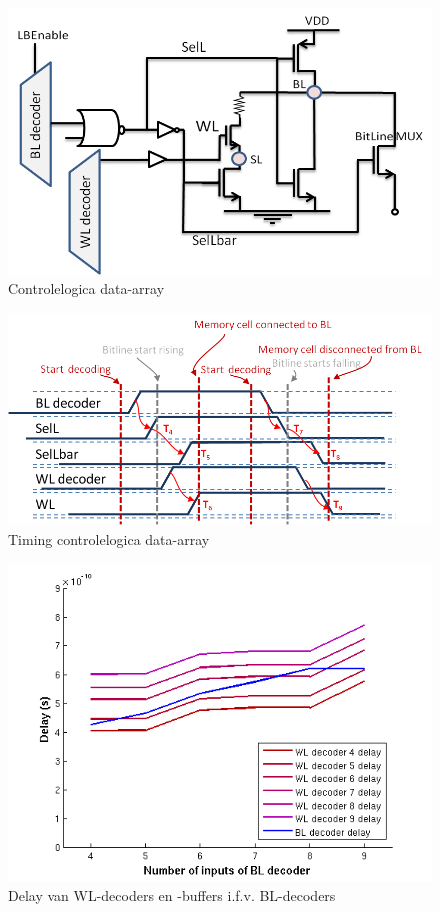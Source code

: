 \begin{figure}[!ht]
  \centering
  \includegraphics[scale=0.6]{../fig/hfdstk-timing-lbcell1.png}
  \caption[Data-array:logica]{Controlelogica data-array}
  \label{fig:lbcell_timing1}
\end{figure}

\begin{figure}[!ht]
  \centering
  \includegraphics[scale=0.9]{../fig/hfdstk-timing-lbcell2.png}
  \caption[Data-array:timing]{Timing controlelogica data-array}
  \label{fig:lbcell_timing2}
\end{figure}

\begin{figure}[!ht]
  \centering
  \includegraphics[scale=0.6]{../fig/hfdstk-timing-decoder-dep.png}
  \caption[Delay van WL-decoders en -buffers i.f.v. BL-decoders]{Delay van WL-decoders en -buffers i.f.v. BL-decoders}
  \label{fig:decoder_dep}
\end{figure}

